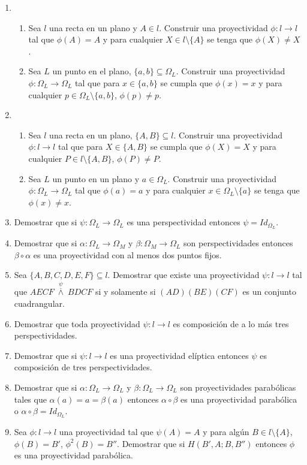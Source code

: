 \documentclass[12pt]{report}
\numberwithin{section}{chapter}
\begin{document}
\begin{enumerate}
\item 
\begin{enumerate}
\item Sea $l$ una recta en un plano y $A \in l$. Construir una proyectividad $\phi:l \to l$ tal que $\phi(A)=A$ y para cualquier $X \in l\setminus\{A\}$ se tenga que $\phi(X) \neq X$.
\item Sea $L$ un punto en el plano, $\{a,b\} \subseteq \Omega_L$. Construir una proyectividad $\phi:\Omega_L \to \Omega_L$ tal que para $x \in \{a,b\}$ se cumpla que $\phi(x)=x$ y para cualquier $p \in \Omega_L \setminus\{a,b\}$, $\phi(p) \neq p$.
\end{enumerate}

\item 
\begin{enumerate}
\item Sea $l$ una recta en un plano, $\{A,B\} \subseteq l$. Construir una proyectividad $\phi:l \to l$ tal que para $X \in \{A,B\}$ se cumpla que $\phi(X)=X$ y para cualquier $P \in l \setminus\{A,B\}$, $\phi(P) \neq P$.
\item Sea $L$ un punto en un plano y $a \in \Omega_L$. Construir una proyectividad $\phi:\Omega_L\to \Omega_L$ tal que $\phi(a)=a$ y para cualquier $x \in \Omega_L\setminus\{a\}$ se tenga que $\phi(x) \neq x$.
\end{enumerate}

\item Demostrar que si $\psi: \Omega_L \to \Omega_L$ es una perspectividad entonces $\psi= Id_{\Omega_L}$. 

\item Demostrar que si $\alpha: \Omega_L \to \Omega_M$ y $\beta: \Omega_M \to \Omega_L$ son perspectividades entonces $\beta \circ \alpha$ es una proyectividad con al menos dos puntos fijos.

\item Sea $\{A,B,C,D,E,F\} \subseteq l$. Demostrar que existe una proyectividad $\psi:l \to l$ tal que \linebreak $AECF\;\overset{\psi}{\overline{\wedge}}\; BDCF$ si y solamente si $(AD)(BE)(CF)$ es un conjunto cuadrangular.

\item Demostrar que toda proyectividad $\psi:l \to l$ es composición de a lo más tres perspectividades.

\item Demostrar que si $\psi:l \to l$ es una proyectividad elíptica entonces $\psi$ es composición de tres perspectividades.

\item Demostrar que si $\alpha: \Omega_L \to \Omega_L$ y $\beta:\Omega_L \to \Omega_L$ son  proyectividades parabólicas tales que $\alpha(a)=a=\beta(a)$ entonces $\alpha \circ \beta$ es una proyectividad parabólica o $\alpha \circ \beta = Id_{\Omega_L}$.

\item Sea $\phi:l \to l$ una proyectividad tal que $\psi(A)=A$ y para algún $B \in l\setminus\{A\}$, $\phi(B)=B'$, $\phi^2(B)=B''$. Demostrar que si $H(B',A;B,B'')$ entonces $\phi$ es una proyectividad parabólica.

\end{enumerate}
\end{document}
